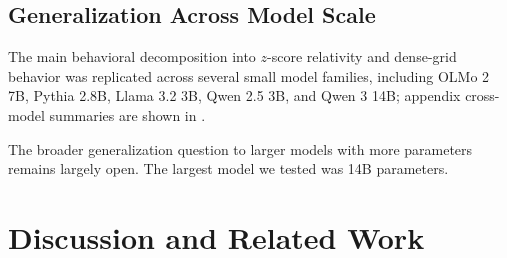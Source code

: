 \documentclass{article}
\newcommand{\primalz}{\ensuremath{d_{z}}}
\begin{document}
\subsection{Generalization Across Model Scale}

The main behavioral decomposition into $z$-score relativity and dense-grid behavior was replicated across several small model families, including OLMo 2 7B, Pythia 2.8B, Llama 3.2 3B, Qwen 2.5 3B, and Qwen 3 14B; appendix cross-model summaries are shown in .

The broader generalization question to larger models with more parameters remains largely open. The largest model we tested was 14B parameters.


\section{Discussion and Related Work}
\label{sec:discussion-related-work}
\label{sec:related-work}




% 

\end{document}
